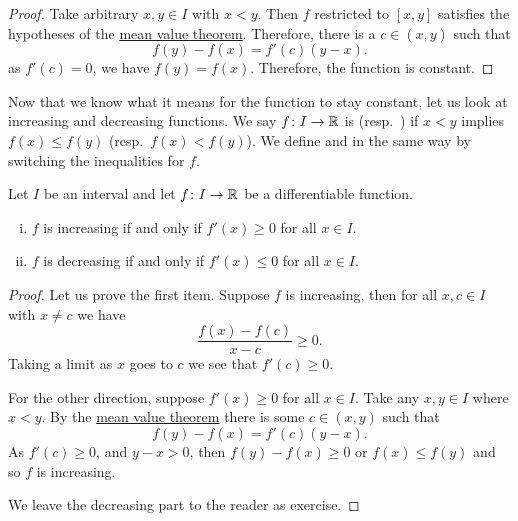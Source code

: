 \begin{proof}
Take arbitrary $x,y \in I$ with $x < y$.
Then $f$ restricted to $[x,y]$ satisfies the hypotheses
of the \hyperref[thm:mvt]{mean value theorem}.
Therefore, there is a $c \in (x,y)$ such that
\begin{equation*}
f(y)-f(x) = f'(c)(y-x).
\end{equation*}
as $f'(c) = 0$, we have $f(y) = f(x)$.  Therefore,
the function is constant.
\end{proof}

Now that we know what it means for the function to stay constant, let us look
at increasing and decreasing functions.
We say $f \colon I \to {\mathbb{R}}$ is \emph{}
(resp.\  \emph{}) if
$x < y$ implies $f(x) \leq f(y)$ (resp.\ $f(x) < f(y)$).
We define
\emph{} and
\emph{} in the same way by switching the
inequalities for $f$.

\begin{prop} \label{incdecdiffprop}
Let $I$ be an interval and
let $f \colon I \to {\mathbb{R}}$ be a differentiable function.
\begin{enumerate}[(i)]
\item $f$ is increasing if and only if $f'(x) \geq 0$ for all $x \in I$.
\item $f$ is decreasing if and only if $f'(x) \leq 0$ for all $x \in I$.
\end{enumerate}
\end{prop}

\begin{proof}
Let us prove the first item.  Suppose $f$ is increasing, then
for all $x,c \in I$ with $x \neq c$ we have
\begin{equation*}
\frac{f(x)-f(c)}{x-c} \geq 0 .
\end{equation*}
Taking a limit as $x$ goes to $c$ we see that $f'(c) \geq 0$.

For the other direction, suppose $f'(x) \geq 0$ for all $x \in I$.
Take any $x, y \in I$ where $x < y$.  By the \hyperref[thm:mvt]{mean value theorem}
there is some $c \in
(x,y)$ such that
\begin{equation*}
f(y)-f(x) = f'(c)(y-x) .
\end{equation*}
As $f'(c) \geq 0$, and $y-x > 0$, then $f(y) - f(x) \geq 0$ or $f(x) \leq
f(y)$ and so
$f$ is increasing.

We leave the decreasing part to the reader as exercise.
\end{proof}

